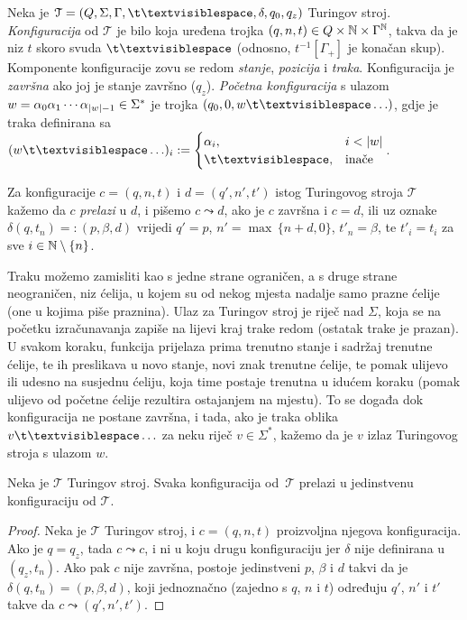 \begin{definicija}
Neka je $\mathcal T=(Q,\Sigma,\Gamma,\bl,\delta,q_0,q_z)$ Turingov stroj. \emph{Konfiguracija} od $\mathcal T$ je bilo koja uređena trojka $(q,n,t)\in Q\times{\mathbb N}\times\Gamma^{\mathbb N}$, takva da je niz $t$ skoro svuda $\bl$ (odnosno, $t^{-1}[\Gamma_+]$ je konačan skup). Komponente konfiguracije zovu se redom \emph{stanje}, \emph{pozicija} i \emph{traka}. Konfiguracija je \emph{završna} ako joj je stanje završno ($q_z$). \emph{Početna konfiguracija} s ulazom $w=\alpha_0\alpha_1\dotsm\alpha_{\lvert w\rvert-1}\in\Sigma^*$ je trojka $(q_0,0,w\bl\ldots)$, gdje je traka definirana sa $(w\bl\ldots)_i:=\begin{cases}
\alpha_i,&i<\dulj{w}\\
\bl,&\text{inače}
\end{cases}$.

Za konfiguracije $c=(q,n,t)$ i $d=(q',n',t')$ istog Turingovog stroja $\mathcal T$ kažemo da $c$ \emph{prelazi} u $d$, i pišemo $c\leadsto d$, ako je $c$ završna i $c=d$, ili uz oznake $\delta(q,t_n)=:(p,\beta,d)$ vrijedi $q'=p$, $n'=\max\,\{n+d,0\}$, $t'_n=\beta$, te $t'_i=t_i$ za sve $i\in{\mathbb N}\setminus\{n\}$.
\end{definicija}

Traku možemo zamisliti kao s jedne strane ograničen, a s druge strane neograničen, niz ćelija, u kojem su od nekog mjesta nadalje samo prazne ćelije (one u kojima piše praznina). Ulaz za Turingov stroj je riječ nad $\Sigma$, koja se na početku izračunavanja zapiše na lijevi kraj trake redom (ostatak trake je prazan). U svakom koraku, funkcija prijelaza prima trenutno stanje i sadržaj trenutne ćelije, te ih preslikava u novo stanje, novi znak trenutne ćelije, te pomak ulijevo ili udesno na susjednu ćeliju, koja time postaje trenutna u idućem koraku (pomak ulijevo od početne ćelije rezultira ostajanjem na mjestu). To se događa dok konfiguracija ne postane završna, i tada, ako je traka oblika $v\bl\ldots$ za neku riječ $v\in\Sigma^*$, kažemo da je $v$ izlaz Turingovog stroja s ulazom $w$.

\begin{lema}\label{lm:Turingdet}
Neka je $\mathcal T$ Turingov stroj. Svaka konfiguracija od \,$\mathcal T$ prelazi u jedinstvenu konfiguraciju od $\mathcal T$.
\end{lema}
\begin{proof}
Neka je $\mathcal T$ Turingov stroj, i $c=(q,n,t)$ proizvoljna njegova konfiguracija. Ako je $q=q_z$, tada $c\leadsto c$, i ni u koju drugu konfiguraciju jer $\delta$ nije definirana u $(q_z,t_n)$. Ako pak $c$ nije završna, postoje jedinstveni $p$, $\beta$ i $d$ takvi da je $\delta(q,t_n)=(p,\beta,d)$, koji jednoznačno (zajedno s $q$, $n$ i $t$) određuju $q'$, $n'$ i $t'$ takve da $c\leadsto(q',n',t')$.
\end{proof}

